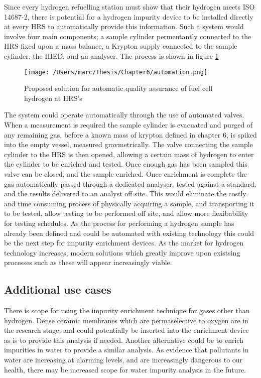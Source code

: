 Since every hydrogen refuelling station must show that their hydrogen meets ISO 14687-2, there is potential for a hydrogen impurity device to be installed directly at every HRS to automatically provide this information. Such a system would involve four main components; a sample cylinder permentantly connected to the HRS fixed upon a mass balance, a Krypton supply connceted to the sample cylinder, the HIED, and an analyser. The process is shown in figure \ref{autoprocedure}


\begin{figure}
    \centering
    \texttt{[image: /Users/marc/Thesis/Chapter6/automation.png]}
    \caption{Proposed solution for automatic quality assurance of fuel cell hydrogen at HRS's}
    \label{autoprocedure}
\end{figure}

The system could operate automatically through the use of automated valves. When a measurement is required the sample cylinder is evacuated and purged of any remaining gas, before a known mass of krypton defined in chapter 6, is spiked into the empty vessel, measured gravmetrically. The valve connecting the sample cylinder to the HRS is then opened, allowing a certain mass of hydrogen to enter the cylinder to be enriched and tested. Once enough gas has been sampled this valve can be closed, and the sample enriched. Once enrichment is complete the gas automatically passed through a dedicated analyser, tested against a standard, and the results delivered to an analyst off site. This would eliminate the costly and time consuming process of physically acquiring a sample, and transporting it to be tested, allow testing to be performed off site, and allow more flexibability for testing schedules. As the process for performing a hydrogen sample has already been defined \cite{BACQUART20205565} and could be automated with existing technology this could be the next step for impurity enrichment devices. As the market for hydrogen technology increases, modern solutions which greatly improve upon existsing processes such as these will appear increasingly viable.

\subsection{Additional use cases}
There is scope for using the impurity enrichment technique for gases other than hydrogen. Dense ceramic membranes which are permaselective to oxygen are in the research stage, \cite{LIU2005103} and could potentially be inserted into the enrichment device as is to provide this analysis if needed. Another alternative could be to enrich impurities in water to provide a similar analysis. As evidence that pollutants in water are increasing at alarming levels, and are increasingly dangerous to our health, there may be increased scope for water impurity analysis in the future. \cite{marketresearchfirm}


